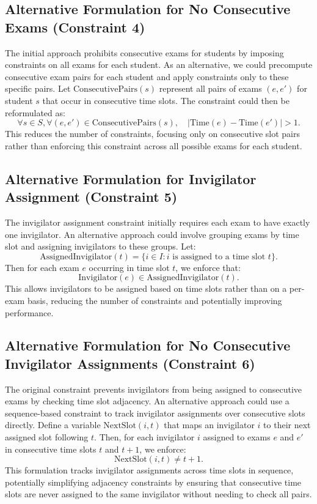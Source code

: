 \documentclass[a4paper]{article}
\begin{document}
    \subsection{Alternative Formulation for No Consecutive Exams (Constraint 4)}
    The initial approach prohibits consecutive exams for students by imposing constraints on all exams for each student. As an alternative, we could precompute consecutive exam pairs for each student and apply constraints only to these specific pairs. Let \( \text{ConsecutivePairs}(s) \) represent all pairs of exams \( (e, e') \) for student \( s \) that occur in consecutive time slots. The constraint could then be reformulated as:
    \[
    \forall s \in S, \forall (e, e') \in \text{ConsecutivePairs}(s), \quad |\text{Time}(e) - \text{Time}(e')| > 1.
    \]
    This reduces the number of constraints, focusing only on consecutive slot pairs rather than enforcing this constraint across all possible exams for each student.
    
    \subsection{Alternative Formulation for Invigilator Assignment (Constraint 5)}
    The invigilator assignment constraint initially requires each exam to have exactly one invigilator. An alternative approach could involve grouping exams by time slot and assigning invigilators to these groups. Let:
    \[
    \text{AssignedInvigilator}(t) = \{ i \in I : i \text{ is assigned to a time slot } t \}.
    \]
    Then for each exam \( e \) occurring in time slot \( t \), we enforce that:
    \[
    \text{Invigilator}(e) \in \text{AssignedInvigilator}(t).
    \]
    This allows invigilators to be assigned based on time slots rather than on a per-exam basis, reducing the number of constraints and potentially improving performance.
    
    \subsection{Alternative Formulation for No Consecutive Invigilator Assignments (Constraint 6)}
    The original constraint prevents invigilators from being assigned to consecutive exams by checking time slot adjacency. An alternative approach could use a sequence-based constraint to track invigilator assignments over consecutive slots directly. Define a variable \( \text{NextSlot}(i, t) \) that maps an invigilator \( i \) to their next assigned slot following \( t \). Then, for each invigilator \( i \) assigned to exams \( e \) and \( e' \) in consecutive time slots \( t \) and \( t+1 \), we enforce:
    \[
    \text{NextSlot}(i, t) \neq t+1.
    \]
    This formulation tracks invigilator assignments across time slots in sequence, potentially simplifying adjacency constraints by ensuring that consecutive time slots are never assigned to the same invigilator without needing to check all pairs.
    
\end{document}
